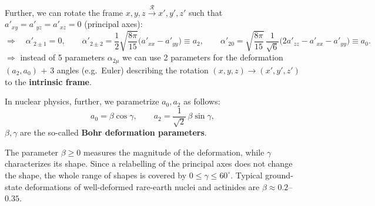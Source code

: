 \documentclass[11pt,a4paper]{article}
\begin{document}
Further, we can rotate the frame $x,y,z\xrightarrow{\ \mathcal R\ }x',y',z'$ such that $a'_{xy}=a'_{yz}=a'_{xz}=0$ (principal axes):
\[
\Rightarrow\quad \alpha'_{2\pm1}=0,\qquad
\alpha'_{2\pm2}=\frac12\sqrt{\frac{8\pi}{15}}\big(a'_{xx}-a'_{yy}\big)\equiv a_2,\qquad
\alpha'_{20}=\sqrt{\frac{8\pi}{15}}\,\frac{1}{\sqrt6}\big(2a'_{zz}-a'_{xx}-a'_{yy}\big)\equiv a_0 .
\]
$\Rightarrow$ instead of 5 parameters $\alpha_{2\mu}$ we can use 2 parameters for the deformation $(a_2,a_0)$ $+$ 3 angles (e.g.\ Euler) describing the rotation $(x,y,z)\to(x',y',z')$ to the \textbf{intrinsic frame}.

In nuclear physics, further, we parametrize $a_0,a_2$ as follows:
\[
a_0=\beta\cos\gamma,\qquad a_2=\frac{1}{\sqrt2}\,\beta\sin\gamma ,
\]
$\beta,\gamma$ are the so-called \textbf{Bohr deformation parameters}.

The parameter $\beta\ge0$ measures the magnitude of the deformation, while $\gamma$ characterizes its shape. Since a relabelling of the principal axes does not change the shape, the whole range of shapes is covered by $0\le\gamma\le60^\circ$. Typical ground-state deformations of well-deformed rare-earth nuclei and actinides are $\beta\approx0.2$--$0.35$.
\end{document}
